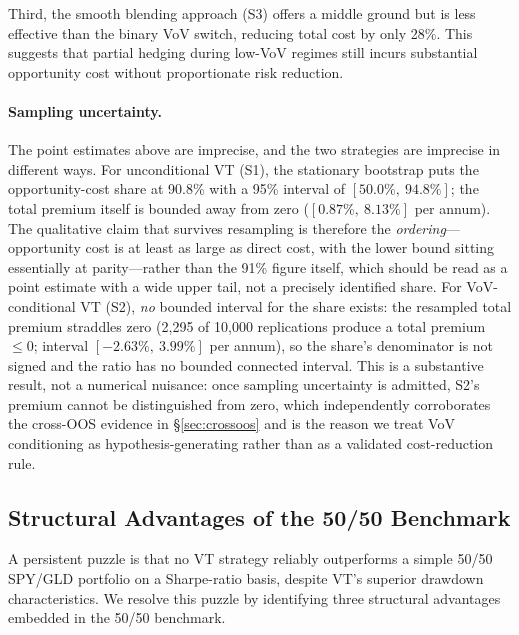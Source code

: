 \documentclass[12pt,a4paper]{article}
\begin{document}
Third, the smooth blending approach (S3) offers a middle ground but is less effective than the binary VoV switch, reducing total cost by only 28\%. This suggests that partial hedging during low-VoV regimes still incurs substantial opportunity cost without proportionate risk reduction.

\paragraph{Sampling uncertainty.} The point estimates above are imprecise, and the two strategies are imprecise in different ways. For unconditional VT (S1), the stationary bootstrap puts the opportunity-cost share at 90.8\% with a 95\% interval of $[50.0\%,\ 94.8\%]$; the total premium itself is bounded away from zero ($[0.87\%,\ 8.13\%]$ per annum). The qualitative claim that survives resampling is therefore the \emph{ordering}---opportunity cost is at least as large as direct cost, with the lower bound sitting essentially at parity---rather than the 91\% figure itself, which should be read as a point estimate with a wide upper tail, not a precisely identified share. For VoV-conditional VT (S2), \emph{no} bounded interval for the share exists: the resampled total premium straddles zero (2{,}295 of 10{,}000 replications produce a total premium $\leq 0$; interval $[-2.63\%,\ 3.99\%]$ per annum), so the share's denominator is not signed and the ratio has no bounded connected interval. This is a substantive result, not a numerical nuisance: once sampling uncertainty is admitted, S2's premium cannot be distinguished from zero, which independently corroborates the cross-OOS evidence in §\ref{sec:crossoos} and is the reason we treat VoV conditioning as hypothesis-generating rather than as a validated cost-reduction rule.

\subsection{Structural Advantages of the 50/50 Benchmark}

A persistent puzzle is that no VT strategy reliably outperforms a simple 50/50 SPY/GLD portfolio on a Sharpe-ratio basis, despite VT's superior drawdown characteristics. We resolve this puzzle by identifying three structural advantages embedded in the 50/50 benchmark.
\end{document}
